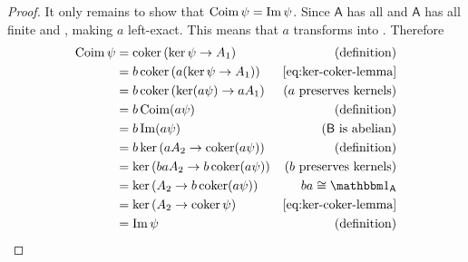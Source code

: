 \documentclass[../main.tex]{subfiles}
\begin{document}
\begin{proof}
  It only remains to show that \(\operatorname*{Coim} \psi = \operatorname*{Im} \psi\).
  Since \(\mathsf{A}\) has all  and  \(\mathsf{A}\) has all finite  and , making \(a\) left-exact.
  This means that \(a\) transforms  into .
  Therefore
  \begin{align*}
    \coim \psi &= \coker \left( \ker \psi \to A_{1} \right)      & (\text{definition}) \\
            &= b\coker \left( a(\ker \psi \to A_{1}) \right)  & \eqref{eq:ker-coker-lemma} \\
            &= b\coker \left( \ker(a\psi) \to aA_{1} \right)  & (a\text{ preserves kernels}) \\
            &= b\coim (a\psi)                                & (\text{definition}) \\
            &= b\im (a\psi)                                  & (\mathsf{B} \text{ is abelian}) \\
            &= b\ker \left( aA_{2} \to \coker(a\psi) \right)  & (\text{definition}) \\
            &= \ker \left( baA_{2} \to b\coker(a\psi) \right) & (b\text{ preserves kernels}) \\
            &= \ker \left( A_{2} \to b\coker(a\psi) \right)   & ba \cong \id_{\mathsf{A}}\\
            &= \ker \left( A_{2} \to \coker \psi \right)      & \eqref{eq:ker-coker-lemma} \\
            &= \im \psi                                     & (\text{definition})
  \end{align*}
\end{proof}
\end{document}
